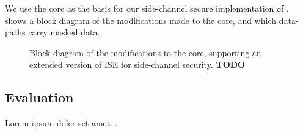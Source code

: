 We use the  core as the basis for our side-channel secure
implementation of .
 shows a block diagram of the modifications
made to the core, and which data-paths carry masked data.

\begin{figure}
\caption{Block diagram of the modifications to the  core,
supporting an extended version of ISE  for side-channel
security. {\bf TODO}}
\label{fig:sca:uarch}
\end{figure}


\subsection{Evaluation}

Lorem ipsum doler set amet...

